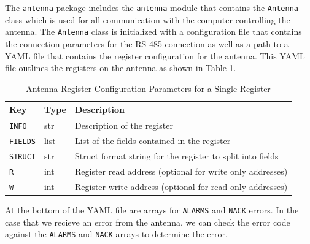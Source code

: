 The \texttt{antenna} package includes the \texttt{antenna} module that contains the \texttt{Antenna} class which is used for all communication with the computer controlling the antenna.
The \texttt{Antenna} class is initialized with a configuration file that contains the connection parameters for the RS-485 connection as well as a path to a YAML file that contains the register configuration for the antenna.
This YAML file outlines the registers on the antenna as shown in Table \ref{readout/table:antenna_regs}.

\begin{table}
    \centering
    \begin{tabularx}{\textwidth}{l|l|X}
        \textbf{Key} & \textbf{Type} & \textbf{Description} \\ \hline    
        \texttt{INFO} & str & Description of the register \\
        \texttt{FIELDS} & list & List of the fields contained in the register \\
        \texttt{STRUCT} & str & Struct format string for the register to split into fields \\
        \texttt{R} & int & Register read address (optional for write only addresses)\\
        \texttt{W} & int & Register write address (optional for read only addresses)\\
    \end{tabularx}
    \label{readout/table:antenna_regs}
    \caption{Antenna Register Configuration Parameters for a Single Register}
\end{table}

At the bottom of the YAML file are arrays for \texttt{ALARMS} and \texttt{NACK} errors. 
In the case that we recieve an error from the antenna, we can check the error code against the \texttt{ALARMS} and \texttt{NACK} arrays to determine the error.

